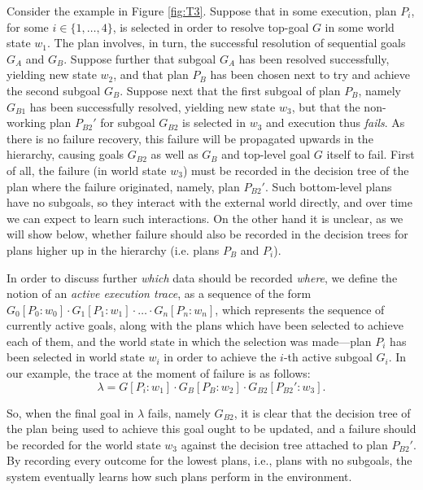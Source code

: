 Consider the example in Figure \ref{fig:T3}.
Suppose that in some execution, plan $P_i$, for some $i \in \{1,\ldots,4\}$, is
selected in order to resolve top-goal $G$ in some world state $w_1$. The plan
involves, in turn, the successful resolution of sequential goals $G_A$ and $G_B$.
Suppose further that subgoal $G_A$ has been resolved successfully, yielding new
state $w_2$, and that plan $P_B$ has been chosen next to try and achieve the
second subgoal $G_B$.
Suppose next that the first subgoal of plan $P_B$, namely $G_{B1}$ has been
successfully resolved, yielding new state $w_3$, but that the non-working plan
$P_{B2}'$ for subgoal $G_{B2}$ is selected in $w_3$ and execution thus
\emph{fails}.
As there is no failure recovery, this failure will be propagated upwards in the
hierarchy, causing goals $G_{B2}$ as well as $G_B$ and top-level goal $G$ itself
to fail.
First of all, the failure (in world state $w_3$) must be recorded in the decision
tree of the plan where the failure originated, namely, plan $P_{B2}'$. 
Such bottom-level plans have no subgoals, so they interact with the
external world directly, and over time we can expect to learn such interactions.
On the other hand it is unclear, as we will show below, whether failure should also be
recorded in the decision trees for plans higher up in the hierarchy (i.e. plans
$P_B$ and $P_i$).






In order to discuss further \emph{which} data should be recorded \emph{where}, we
define the notion of an \textit{active execution trace}, as a sequence of the
form $G_0[P_0:w_0] \cdot G_1[P_1:w_1] \cdot \ldots \cdot G_n[P_n:w_n]$, which
represents the sequence of currently active goals, along with the plans which
have been selected to achieve each of them, and the world state in which the
selection was made---plan $P_i$ has been selected in world state $w_i$ in order
to achieve the $i$-th active subgoal $G_i$.
In our example, the trace at the moment of failure is as follows: \[
\lambda=G[P_i:w_1] \cdot G_B[P_B:w_2] \cdot G_{B2}[P_{B2}':w_3]. \]


So, when the final goal in $\lambda$ fails, namely $G_{B2}$, it is clear that the
decision tree of the plan being used to achieve this goal ought to be updated,
and a failure should be recorded for the world state $w_3$ against 
the decision tree attached to plan $P_{B2}'$.  
By recording every outcome for the lowest plans, i.e., plans with no subgoals,
the system eventually learns how such plans perform in the environment.

